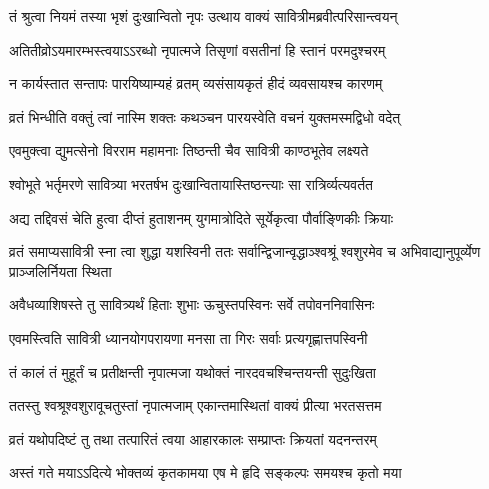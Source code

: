 \begin{center}
\twolineshloka
{तं श्रुत्वा नियमं तस्या भृशं दुःखान्वितो नृपः}
{उत्थाय वाक्यं सावित्रीमब्रवीत्परिसान्त्वयन्}


\twolineshloka
{अतितीव्रोऽयमारम्भस्त्वयाऽऽरब्धो नृपात्मजे}
{तिसृणां वसतीनां हि स्तानं परमदुश्चरम्}




\twolineshloka
{न कार्यस्तात सन्तापः पारयिष्याम्यहं व्रतम्}
{व्यसंसायकृतं हीदं व्यवसायश्च कारणम्}




\twolineshloka
{व्रतं भिन्धीति वक्तुं त्वां नास्मि शक्तः कथञ्चन}
{पारयस्वेति वचनं युक्तमस्मद्विधो वदेत्}




\twolineshloka
{एवमुक्त्वा द्युमत्सेनो विरराम महामनाः}
{तिष्ठन्ती चैव सावित्री काण्ठभूतेव लक्ष्यते}


\twolineshloka
{श्वोभूते भर्तृमरणे सावित्र्या भरतर्षभ}
{दुःखान्वितायास्तिष्ठन्त्याः सा रात्रिर्व्यत्यवर्तत}


\twolineshloka
{अद्य तद्दिवसं चेति हुत्वा दीप्तं हुताशनम्}
{युगमात्रोदिते सूर्येकृत्वा पौर्वाङ्णिकीः क्रियाः}


\threelineshloka
{व्रतं समाप्यसावित्री स्ना त्वा शुद्धा यशस्विनी}
{ततः सर्वान्द्विजान्वृद्धाञ्श्वश्रूं श्वशुरमेव च}
{अभिवाद्यानुपूर्व्येण प्राञ्जलिर्नियता स्थिता}


\twolineshloka
{अवैधव्याशिषस्ते तु सावित्र्यर्थं हिताः शुभाः}
{ऊचुस्तपस्विनः सर्वे तपोवननिवासिनः}


\twolineshloka
{एवमस्त्विति सावित्री ध्यानयोगपरायणा}
{मनसा ता गिरः सर्वाः प्रत्यगृह्णात्तपस्विनी}


\twolineshloka
{तं कालं तं मुहूर्तं च प्रतीक्षन्ती नृपात्मजा}
{यथोक्तं नारदवचश्चिन्तयन्ती सुदुःखिता}


\twolineshloka
{ततस्तु श्वश्रूश्वशुरावूचतुस्तां नृपात्मजाम्}
{एकान्तमास्थितां वाक्यं प्रीत्या भरतसत्तम}


\twolineshloka
{व्रतं यथोपदिष्टं तु तथा तत्पारितं त्वया}
{आहारकालः सम्प्राप्तः क्रियतां यदनन्तरम्}




\twolineshloka
{अस्तं गते मयाऽऽदित्ये भोक्तव्यं कृतकामया}
{एष मे हृदि सङ्कल्पः समयश्च कृतो मया}





\end{center}
